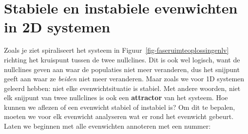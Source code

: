 \documentclass[
  a4paper,
]{scrbook}
\theoremstyle{definition}
\theoremstyle{remark}
\begin{document}
\hypertarget{stabiele-en-instabiele-evenwichten-in-2d-systemen}{%
\section{Stabiele en instabiele evenwichten in 2D
systemen}\label{stabiele-en-instabiele-evenwichten-in-2d-systemen}}

Zoals je ziet spiraliseert het systeem in
Figuur~\ref{fig-faseruimteoplossingenlv} richting het kruispunt tussen
de twee nullclines. Dit is ook wel logisch, want de nullclines geven aan
waar de populaties niet meer veranderen, dus het snijpunt geeft aan waar
ze \emph{beiden} niet meer veranderen. Maar zoals we voor 1D systemen
geleerd hebben: niet elke evenwichtsituatie is stabiel. Met andere
woorden, niet elk snijpunt van twee nullclines is ook een
\textbf{attractor} van het systeem. Hoe kunnen we aflezen of een
evenwicht stabiel of instabiel is? Om dit te bepalen, moeten we voor elk
evenwicht analyseren wat er rond het evenwicht gebeurt. Laten we
beginnen met alle evenwichten annoteren met een nummer:
\end{document}
